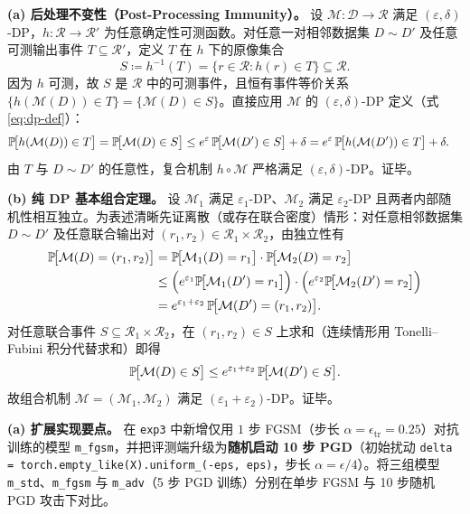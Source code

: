 
\textbf{(a) 后处理不变性（Post-Processing Immunity）。}
设 $\mathcal{M}: \mathcal{D} \to \mathcal{R}$ 满足 $(\varepsilon, \delta)$-DP，$h: \mathcal{R} \to \mathcal{R}'$ 为任意确定性可测函数。对任意一对相邻数据集 $D \sim D'$ 及任意可测输出事件 $T \subseteq \mathcal{R}'$，定义 $T$ 在 $h$ 下的原像集合
\[
  S \coloneqq h^{-1}(T) = \{r \in \mathcal{R} : h(r) \in T\} \subseteq \mathcal{R}.
\]
因为 $h$ 可测，故 $S$ 是 $\mathcal{R}$ 中的可测事件，且恒有事件等价关系 $\{h(\mathcal{M}(D)) \in T\} = \{\mathcal{M}(D) \in S\}$。直接应用 $\mathcal{M}$ 的 $(\varepsilon, \delta)$-DP 定义（式 \eqref{eq:dp-def}）：
\begin{align*}
  \mathbb{P}\!\big[h(\mathcal{M}(D)) \in T\big]
  &= \mathbb{P}\!\big[\mathcal{M}(D) \in S\big]
   \le e^{\varepsilon}\,\mathbb{P}\!\big[\mathcal{M}(D') \in S\big] + \delta
   = e^{\varepsilon}\,\mathbb{P}\!\big[h(\mathcal{M}(D')) \in T\big] + \delta.
\end{align*}
由 $T$ 与 $D \sim D'$ 的任意性，复合机制 $h \circ \mathcal{M}$ 严格满足 $(\varepsilon, \delta)$-DP。证毕。

\textbf{(b) 纯 DP 基本组合定理。}
设 $\mathcal{M}_1$ 满足 $\varepsilon_1$-DP、$\mathcal{M}_2$ 满足 $\varepsilon_2$-DP 且两者内部随机性相互独立。为表述清晰先证离散（或存在联合密度）情形：对任意相邻数据集 $D \sim D'$ 及任意联合输出对 $(r_1, r_2) \in \mathcal{R}_1 \times \mathcal{R}_2$，由独立性有
\begin{align*}
  \mathbb{P}\!\big[\mathcal{M}(D) = (r_1, r_2)\big]
  &= \mathbb{P}\!\big[\mathcal{M}_1(D) = r_1\big] \cdot \mathbb{P}\!\big[\mathcal{M}_2(D) = r_2\big] \\
  &\le \Big(e^{\varepsilon_1}\mathbb{P}\!\big[\mathcal{M}_1(D') = r_1\big]\Big)
       \cdot \Big(e^{\varepsilon_2}\mathbb{P}\!\big[\mathcal{M}_2(D') = r_2\big]\Big) \\
  &= e^{\varepsilon_1 + \varepsilon_2}\,\mathbb{P}\!\big[\mathcal{M}(D') = (r_1, r_2)\big].
\end{align*}
对任意联合事件 $S \subseteq \mathcal{R}_1 \times \mathcal{R}_2$，在 $(r_1, r_2) \in S$ 上求和（连续情形用 Tonelli--Fubini 积分代替求和）即得
\[
  \mathbb{P}\!\big[\mathcal{M}(D) \in S\big]
  \le e^{\varepsilon_1 + \varepsilon_2}\,\mathbb{P}\!\big[\mathcal{M}(D') \in S\big].
\]
故组合机制 $\mathcal{M} = (\mathcal{M}_1, \mathcal{M}_2)$ 满足 $(\varepsilon_1 + \varepsilon_2)$-DP。证毕。


\textbf{(a) 扩展实现要点。}
在 \texttt{exp3} 中新增仅用 $1$ 步 FGSM（步长 $\alpha = \epsilon_{\text{tr}} = 0.25$）对抗训练的模型 \texttt{m\_fgsm}，并把评测端升级为\textbf{随机启动 10 步 PGD}（初始扰动 \texttt{delta = torch.empty\_like(X).uniform\_(-eps, eps)}，步长 $\alpha = \epsilon / 4$）。将三组模型 \texttt{m\_std}、\texttt{m\_fgsm} 与 \texttt{m\_adv}（5 步 PGD 训练）分别在单步 FGSM 与 10 步随机 PGD 攻击下对比。

